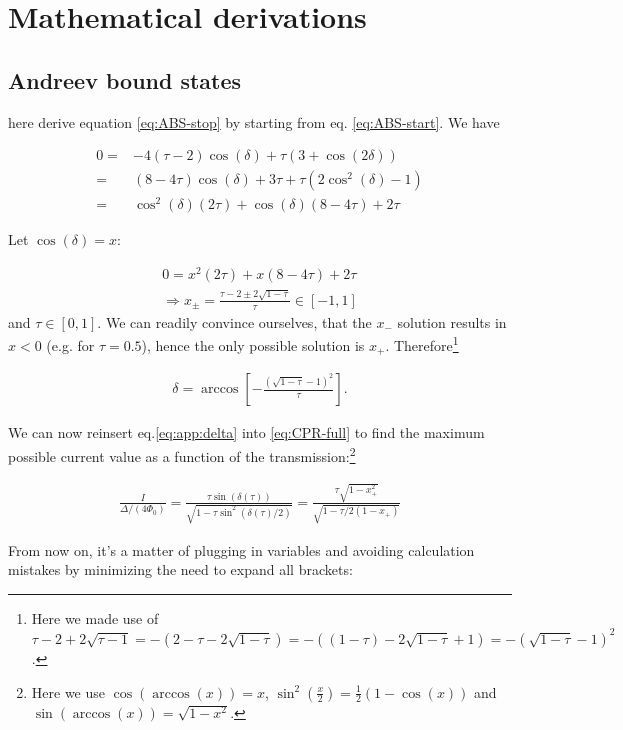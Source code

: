 \chapter{Mathematical derivations}
\label{app:eqs}

\section{Andreev bound states}

 here derive equation \ref{eq:ABS-stop} by starting from eq. \ref{eq:ABS-start}. We have

\begin{align}
0 = &-4(\tau-2)\cos(\delta) +\tau(3+\cos(2\delta)) \\
= &(8-4\tau)\cos(\delta)+3\tau+\tau(2\cos^2(\delta)-1) \\
= &\cos^2(\delta)(2\tau)+\cos(\delta)(8-4\tau)+2\tau
\end{align}

Let $\cos(\delta)=x$:

\begin{eqnarray}
0=x^2(2\tau)+x(8-4\tau)+2\tau \\
\Rightarrow x_{\pm}=\frac{\tau-2\pm2\sqrt{1-\tau}}{\tau} \in [-1,1]
\end{eqnarray}
and $\tau\in [0,1]$. We can readily convince ourselves, that the $x_{-}$ solution results in $x<0$ (e.g. for $\tau=0.5$), hence the only possible solution is $x_{+}$. Therefore\footnote{Here we made use of $\tau-2+2\sqrt{\tau-1}=-(2-\tau-2\sqrt{1-\tau})=-((1-\tau)-2\sqrt{1-\tau}+1)=-(\sqrt{1-\tau}-1)^2$.}

\begin{eqnarray}
\delta=\arccos\left[ - \frac{(\sqrt{1-\tau}-1)^2}{\tau} \right].
\label{eq:app:delta}
\end{eqnarray}

We can now reinsert eq.\ref{eq:app:delta} into \ref{eq:CPR-full} to find the maximum possible current value as a function of the transmission:\footnote{Here we use $\cos(\arccos(x))=x$, $\sin^2( \frac{x}{2} )=\frac{1}{2}(1-\cos(x))$ and $\sin(\arccos(x))=\sqrt{1-x^2}$.}

\begin{eqnarray}
\frac{I}{\Delta/(4\Phi_0)} = \frac{\tau\sin(\delta(\tau))}{\sqrt{1-\tau\sin^2(\delta(\tau)/2)}} = \frac{\tau\sqrt{1-x_{+}^2}}{\sqrt{1-\tau/2(1-x_{+})}}
\end{eqnarray}

From now on, it's a matter of plugging in variables and avoiding calculation mistakes by minimizing the need to expand all brackets:

